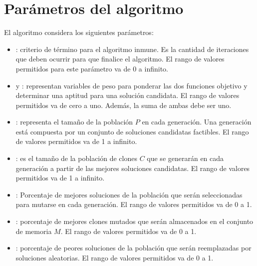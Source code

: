 \section{Parámetros del algoritmo}

El algoritmo considera los siguientes parámetros:

\begin{itemize}
\item \generaciones: criterio de término para el algoritmo inmune. Es la cantidad de iteraciones que deben ocurrir para que finalice el algoritmo. El rango de valores permitidos para este parámetro va de 0 a infinito.
\item \alp{ } y \bet: representan variables de peso para ponderar las dos funciones objetivo y determinar una aptitud para una solución candidata. El rango de valores permitidos va de cero a uno. Además, la suma de ambas debe ser uno.
\item \popsize: representa el tamaño de la población $P$ en cada generación. Una generación está compuesta por un conjunto de soluciones candidatas factibles. El rango de valores permitidos va de 1 a infinito.
\item \clonsize: es el tamaño de la población de clones $C$ que se generarán en cada generación a partir de las mejores soluciones candidatas. El rango de valores permitidos va de 1 a infinito.
\item \pmejores: Porcentaje de mejores soluciones de la población que serán seleccionadas para mutarse en cada generación. El rango de valores permitidos va de 0 a 1.
\item \pclones: porcentaje de mejores clones mutados que serán almacenados en el conjunto de memoria $M$. El rango de valores permitidos va de 0 a 1.
\item \preemplazo: porcentaje de peores soluciones de la población que serán reemplazadas por soluciones aleatorias. El rango de valores permitidos va de 0 a 1.
\end{itemize}
